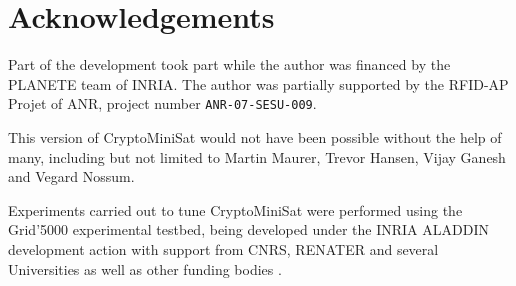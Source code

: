 \documentclass[final]{ieee}
\begin{document}
\section*{Acknowledgements}
Part of the development took part while the author was financed by the PLANETE team of INRIA. The author was partially supported by the RFID-AP Projet of ANR, project number \texttt{ANR-07-SESU-009}.

This version of CryptoMiniSat would not have been possible without the help of many, including but not limited to Martin Maurer, Trevor Hansen, Vijay Ganesh and Vegard Nossum.

Experiments carried out to tune CryptoMiniSat were performed using the Grid'5000
experimental testbed, being developed under the INRIA ALADDIN development 
action with support from CNRS, RENATER and several Universities as well 
as other funding bodies \cite{Grid5000}.





\vfill
\pagebreak
\end{document}
